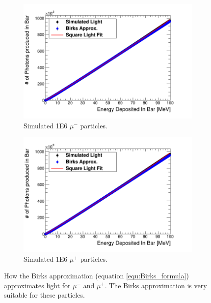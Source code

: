 \begin{figure}[htbp]
\centering
\begin{subfigure}{.5\textwidth}
  \centering
  \includegraphics[width=\linewidth]{Appendix5/newFigs/mu-BirksSlab_simAndApproxLight.png}
  \captionsetup{width=.9\linewidth}
  \caption{Simulated 1E6 $\mu^-$ particles.}
  \label{subfig:append5_light_of_muons0-100mev}
\end{subfigure}%
\begin{subfigure}{.5\textwidth}
  \centering
  \includegraphics[width=\linewidth]{Appendix5/newFigs/mu+BirksSlab_simAndApproxLight.png}
  \captionsetup{width=.9\linewidth}
  \caption{Simulated 1E6 $\mu^+$ particles.}
  \label{subfig:append5_light_of_Amuons0-100mev}
\end{subfigure}
\caption{How the Birks approximation (equation \ref{equ:Birks_formula}) approximates light for $\mu^-$ and $\mu^+$. The Birks approximation is very suitable for these particles.}
\label{fig:append5_light_of_muons_Amuons0-100mev}
\end{figure}

